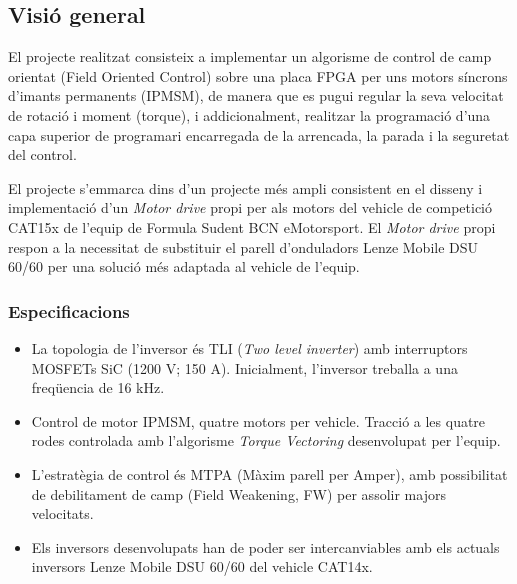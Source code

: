 \subsection{Visió general}
{
    El projecte realitzat consisteix a implementar un algorisme de control de
    camp orientat (Field Oriented Control) sobre una placa FPGA per uns motors
    síncrons d’imants permanents (IPMSM), de manera que es pugui regular la
    seva velocitat de rotació i moment (torque), i addicionalment, realitzar la
    programació d'una capa superior de programari encarregada de la arrencada,
    la parada i la seguretat del control.
    
    El projecte s’emmarca dins d’un projecte més ampli consistent en el
    disseny i implementació d’un \emph{Motor drive} propi per als motors del
    vehicle de competició CAT15x de l’equip de Formula Sudent BCN eMotorsport.
    El \emph{Motor drive} propi respon a la necessitat de substituir el parell
    d'onduladors Lenze Mobile DSU 60/60 per una solució més adaptada al vehicle
    de l'equip.

    \subsubsection*{Especificacions}
    {
        \begin{itemize}
            \item 
                La topologia de l'inversor és TLI (\emph{Two level inverter}) amb
                interruptors MOSFETs SiC (1200 V; 150 A). Inicialment, l'inversor
                treballa a una freqüencia de 16 kHz.
            \item 
                Control de motor IPMSM, quatre motors per vehicle. Tracció a les
                quatre rodes controlada amb l'algorisme \emph{Torque Vectoring}
                desenvolupat per l'equip.
            \item 
                L'estratègia de control és MTPA (Màxim parell per Amper), amb
                possibilitat de debilitament de camp (Field Weakening, FW) per
                assolir majors velocitats.
            \item 
                Els inversors desenvolupats han de poder ser intercanviables amb
                els actuals inversors Lenze Mobile DSU 60/60 del vehicle CAT14x.  
        \end{itemize}
    }
}

